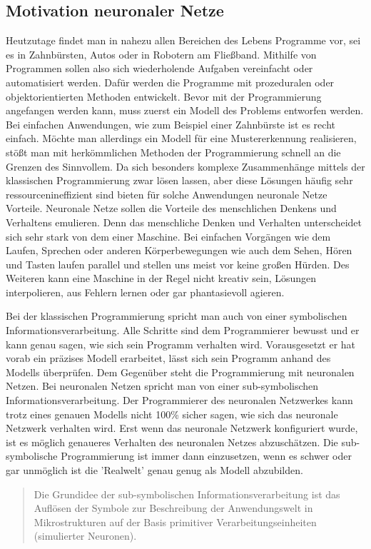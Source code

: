 \subsection{Motivation neuronaler Netze}
Heutzutage findet man in nahezu allen Bereichen des Lebens Programme vor, sei es in Zahnbürsten, Autos oder in Robotern am Fließband. Mithilfe von Programmen sollen also sich wiederholende Aufgaben vereinfacht oder automatisiert werden. Dafür werden die Programme mit prozeduralen oder objektorientierten Methoden entwickelt. Bevor mit der Programmierung angefangen werden kann, muss zuerst ein Modell des Problems entworfen werden. Bei einfachen Anwendungen, wie zum Beispiel einer Zahnbürste ist es recht einfach. Möchte man allerdings ein Modell für eine Mustererkennung realisieren, stößt man mit herkömmlichen Methoden der Programmierung schnell an die Grenzen des Sinnvollem. Da sich besonders komplexe Zusammenhänge mittels der klassischen Programmierung zwar lösen lassen, aber diese Lösungen häufig sehr ressourcenineffizient sind bieten für solche Anwendungen neuronale Netze Vorteile. Neuronale Netze sollen die Vorteile des menschlichen Denkens und Verhaltens emulieren. Denn das menschliche Denken und Verhalten unterscheidet sich sehr stark von dem einer Maschine. Bei einfachen Vorgängen wie dem Laufen, Sprechen oder anderen Körperbewegungen wie auch dem Sehen, Hören und Tasten laufen parallel und stellen uns meist vor keine großen Hürden. Des Weiteren kann eine Maschine in der Regel nicht kreativ sein, Lösungen interpolieren, aus Fehlern lernen oder gar phantasievoll agieren.

Bei der klassischen Programmierung spricht man auch von einer symbolischen Informationsverarbeitung. Alle Schritte sind dem Programmierer bewusst und er kann genau sagen, wie sich sein Programm verhalten wird. Vorausgesetzt er hat vorab ein präzises Modell erarbeitet, lässt sich sein Programm anhand des Modells überprüfen. Dem Gegenüber steht die Programmierung mit neuronalen Netzen. Bei neuronalen Netzen spricht man von einer sub-symbolischen Informationsverarbeitung. Der Programmierer des neuronalen Netzwerkes kann trotz eines genauen Modells nicht 100\% sicher sagen, wie sich das neuronale Netzwerk verhalten wird. Erst wenn das neuronale Netzwerk konfiguriert wurde, ist es möglich genaueres Verhalten des neuronalen Netzes abzuschätzen. Die sub-symbolische Programmierung ist immer dann einzusetzen, wenn es schwer oder gar unmöglich ist die 'Realwelt' genau genug als Modell abzubilden. 

\begin{quote}
    Die Grundidee der sub-symbolischen Informationsverarbeitung ist das Auflösen der Symbole zur Beschreibung der Anwendungswelt in Mikrostrukturen auf der Basis primitiver Verarbeitungseinheiten (simulierter Neuronen). \cite[S. 9]{Kratzer1991} 
\end{quote}

